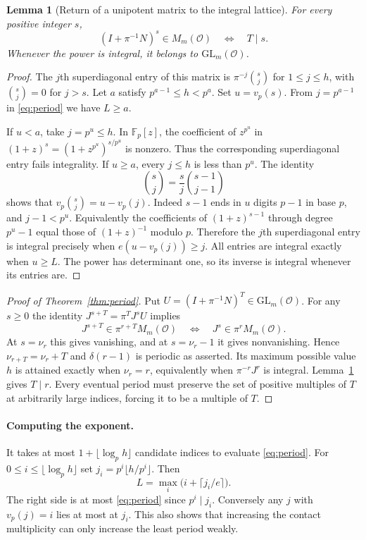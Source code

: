 \documentclass[11pt,letterpaper]{article}
\newtheorem{lemma}[theorem]{Lemma}
\newcommand{\OO}{\mathcal O}
\begin{document}
\begin{lemma}[Return of a unipotent matrix to the integral lattice]\label{lem:return}
For every positive integer $s$,
\[
 (I+\pi^{-1}N)^s\in M_m(\OO)\quad\Longleftrightarrow\quad T\mid s.
\]
Whenever the power is integral, it belongs to $\mathrm{GL}_m(\OO)$.
\end{lemma}
\begin{proof}
The $j$th superdiagonal entry of this matrix is $\pi^{-j}\binom{s}{j}$ for $1\le j\le h$, with $\binom{s}{j}=0$ for $j>s$. Let $a$ satisfy $p^{a-1}\le h<p^a$. Set $u=v_p(s)$. From $j=p^{a-1}$ in \eqref{eq:period} we have $L\ge a$.

If $u<a$, take $j=p^u\le h$. In $\mathbb F_p[z]$, the coefficient of $z^{p^u}$ in $(1+z)^s=(1+z^{p^u})^{s/p^u}$ is nonzero. Thus the corresponding superdiagonal entry fails integrality. If $u\ge a$, every $j\le h$ is less than $p^u$. The identity
\[
 \binom{s}{j}=\frac{s}{j}\binom{s-1}{j-1}
\]
shows that $v_p\binom{s}{j}=u-v_p(j)$. Indeed $s-1$ ends in $u$ digits $p-1$ in base $p$, and $j-1<p^u$. Equivalently the coefficients of $(1+z)^{s-1}$ through degree $p^u-1$ equal those of $(1+z)^{-1}$ modulo $p$. Therefore the $j$th superdiagonal entry is integral precisely when $e(u-v_p(j))\ge j$. All entries are integral exactly when $u\ge L$. The power has determinant one, so its inverse is integral whenever its entries are.
\end{proof}

\begin{proof}[Proof of Theorem~\ref{thm:period}]
Put $U=(I+\pi^{-1}N)^T\in\mathrm{GL}_m(\OO)$. For any $s\ge0$ the identity $J^{s+T}=\pi^T J^sU$ implies
\[
 J^{s+T}\in\pi^{r+T}M_m(\OO)
 \quad\Longleftrightarrow\quad J^s\in\pi^rM_m(\OO).
\]
At $s=\nu_r$ this gives vanishing, and at $s=\nu_r-1$ it gives nonvanishing. Hence $\nu_{r+T}=\nu_r+T$ and $\delta(r-1)$ is periodic as asserted. Its maximum possible value $h$ is attained exactly when $\nu_r=r$, equivalently when $\pi^{-r}J^r$ is integral. Lemma~\ref{lem:return} gives $T\mid r$. Every eventual period must preserve the set of positive multiples of $T$ at arbitrarily large indices, forcing it to be a multiple of $T$.
\end{proof}

\paragraph{Computing the exponent.}
It takes at most $1+\lfloor\log_p h\rfloor$ candidate indices to evaluate \eqref{eq:period}. For $0\le i\le\lfloor\log_p h\rfloor$ set $j_i=p^i\lfloor h/p^i\rfloor$. Then
\[
   L=\max_{i}\bigl(i+\lceil j_i/e\rceil\bigr).
\]
The right side is at most \eqref{eq:period} since $p^i\mid j_i$. Conversely any $j$ with $v_p(j)=i$ lies at most at $j_i$. This also shows that increasing the contact multiplicity can only increase the least period weakly.
\end{document}
